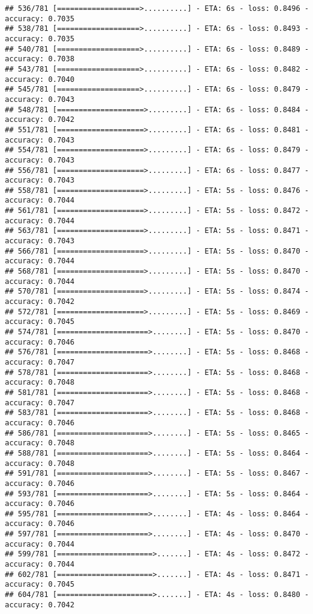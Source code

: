 \documentclass[
]{article}
\begin{document}
\begin{verbatim}
## 536/781 [===================>..........] - ETA: 6s - loss: 0.8496 - accuracy: 0.7035
## 538/781 [===================>..........] - ETA: 6s - loss: 0.8493 - accuracy: 0.7035
## 540/781 [===================>..........] - ETA: 6s - loss: 0.8489 - accuracy: 0.7038
## 543/781 [===================>..........] - ETA: 6s - loss: 0.8482 - accuracy: 0.7040
## 545/781 [===================>..........] - ETA: 6s - loss: 0.8479 - accuracy: 0.7043
## 548/781 [====================>.........] - ETA: 6s - loss: 0.8484 - accuracy: 0.7042
## 551/781 [====================>.........] - ETA: 6s - loss: 0.8481 - accuracy: 0.7043
## 554/781 [====================>.........] - ETA: 6s - loss: 0.8479 - accuracy: 0.7043
## 556/781 [====================>.........] - ETA: 6s - loss: 0.8477 - accuracy: 0.7043
## 558/781 [====================>.........] - ETA: 5s - loss: 0.8476 - accuracy: 0.7044
## 561/781 [====================>.........] - ETA: 5s - loss: 0.8472 - accuracy: 0.7044
## 563/781 [====================>.........] - ETA: 5s - loss: 0.8471 - accuracy: 0.7043
## 566/781 [====================>.........] - ETA: 5s - loss: 0.8470 - accuracy: 0.7044
## 568/781 [====================>.........] - ETA: 5s - loss: 0.8470 - accuracy: 0.7044
## 570/781 [====================>.........] - ETA: 5s - loss: 0.8474 - accuracy: 0.7042
## 572/781 [====================>.........] - ETA: 5s - loss: 0.8469 - accuracy: 0.7045
## 574/781 [=====================>........] - ETA: 5s - loss: 0.8470 - accuracy: 0.7046
## 576/781 [=====================>........] - ETA: 5s - loss: 0.8468 - accuracy: 0.7047
## 578/781 [=====================>........] - ETA: 5s - loss: 0.8468 - accuracy: 0.7048
## 581/781 [=====================>........] - ETA: 5s - loss: 0.8468 - accuracy: 0.7047
## 583/781 [=====================>........] - ETA: 5s - loss: 0.8468 - accuracy: 0.7046
## 586/781 [=====================>........] - ETA: 5s - loss: 0.8465 - accuracy: 0.7048
## 588/781 [=====================>........] - ETA: 5s - loss: 0.8464 - accuracy: 0.7048
## 591/781 [=====================>........] - ETA: 5s - loss: 0.8467 - accuracy: 0.7046
## 593/781 [=====================>........] - ETA: 5s - loss: 0.8464 - accuracy: 0.7046
## 595/781 [=====================>........] - ETA: 4s - loss: 0.8464 - accuracy: 0.7046
## 597/781 [=====================>........] - ETA: 4s - loss: 0.8470 - accuracy: 0.7044
## 599/781 [======================>.......] - ETA: 4s - loss: 0.8472 - accuracy: 0.7044
## 602/781 [======================>.......] - ETA: 4s - loss: 0.8471 - accuracy: 0.7045
## 604/781 [======================>.......] - ETA: 4s - loss: 0.8480 - accuracy: 0.7042

\end{verbatim}
\end{document}
